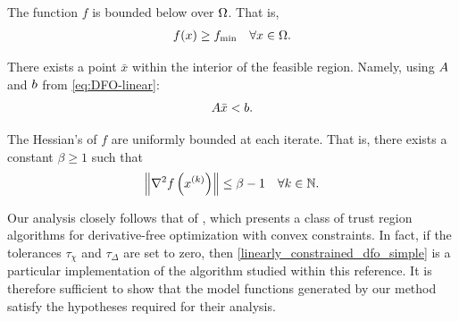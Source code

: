 \begin{assumption}
\label{lower_bound}
The function $f$ is bounded below over $\Omega$.
That is,
\begin{align}
f(x) \ge f_{\text{min}} \quad \forall x \in \Omega.
\end{align}
\end{assumption}

\begin{assumption}
\label{interior_point}
There exists a point $\bar x$ within the interior of the feasible region.
Namely, using ${A}$ and ${b}$ from \cref{eq:DFO-linear}:
\begin{align}
{A} \bar x < {b}.
\end{align}
\end{assumption}


\begin{assumption}
\label{uniformly_bounded_hessians_of_f}
The Hessian's of $f$ are uniformly bounded at each iterate. That is, there exists a constant $\beta \ge 1$ such that
\begin{align*}
\left\|\nabla^2 f\left(x^{(k)}\right)\right\| \le \beta - 1\quad \forall k \in \mathbb N.
\end{align*}
\end{assumption}


%





Our analysis closely follows that of \cite{Conejo:2013:GCT:2620806.2621814},
which presents a class of trust region algorithms for derivative-free optimization with convex constraints.
In fact, if the tolerances $\tau_{\chi}$ and $\tau_{\Delta}$ are set to zero,  
then \cref{linearly_constrained_dfo_simple} is a particular implementation of the algorithm studied within this reference.
It is therefore sufficient to show that the model functions generated by our method satisfy the hypotheses required for their analysis.

